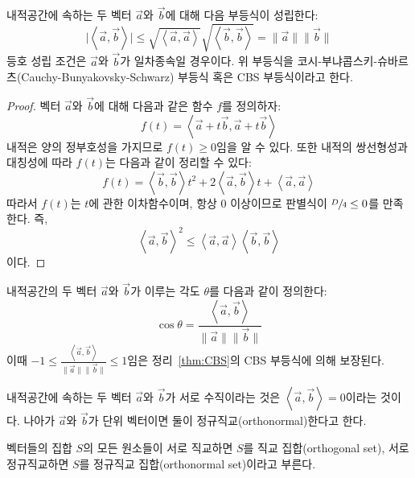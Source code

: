 \documentclass[sections/engineering_mathematics_lecture_note.tex]{subfiles}
\begin{document}
\begin{theorem}  \label{thm:CBS}
    내적공간에 속하는 두 벡터 $\vec a$와 $\vec b$에 대해 다음 부등식이 성립한다:
    \begin{equation*}
        \bigl|\left<\vec a, \vec b\right>\bigr| \leq \sqrt{\left<\vec a, \vec a\right>} \sqrt{\left<\vec b, \vec b\right>} = \lVert \vec a \rVert \lVert \vec b \rVert
    \end{equation*}
    등호 성립 조건은 $\vec a$와 $\vec b$가 일차종속일 경우이다.
    위 부등식을 코시-부냐콥스키-슈바르츠(Cauchy-Bunyakovsky-Schwarz) 부등식 혹은 CBS 부등식이라고 한다.
\end{theorem}

\begin{proof}
    벡터 $\vec a$와 $\vec b$에 대해 다음과 같은 함수 $f$를 정의하자:
    \begin{equation*}
        f(t) = \left<\vec a + t \vec b, \vec a + t \vec b\right>
    \end{equation*}
    내적은 양의 정부호성을 가지므로 $f(t) \geq 0$임을 알 수 있다.
    또한 내적의 쌍선형성과 대칭성에 따라 $f(t)$는 다음과 같이 정리할 수 있다:
    \begin{equation*}
        f(t) = \left<\vec b, \vec b\right> t^2 + 2 \left<\vec a, \vec b\right> t + \left<\vec a, \vec a\right>
    \end{equation*}
    따라서 $f(t)$는 $t$에 관한 이차함수이며, 항상 0 이상이므로 판별식이 $\sfrac D4 \leq 0$를 만족한다.
    즉,
    \begin{equation*}
       \left<\vec a, \vec b\right>^2 \leq \left<\vec a, \vec a\right> \left<\vec b, \vec b\right>
    \end{equation*}
    이다.
\end{proof}

\begin{definition}
    내적공간의 두 벡터 $\vec a$와 $\vec b$가 이루는 각도 $\theta$를 다음과 같이 정의한다:
    \begin{equation*}
        \cos \theta = \frac{\left<\vec a, \vec b\right>}{\lVert \vec a\rVert \lVert \vec b \rVert}
    \end{equation*}
    이때 $-1 \leq \frac{\left<\vec a, \vec b\right>}{\lVert \vec a\rVert \lVert \vec b \rVert} \leq 1$임은 정리~\ref{thm:CBS}의 CBS 부등식에 의해 보장된다.
\end{definition}

\begin{definition}
    내적공간에 속하는 두 벡터 $\vec a$와 $\vec b$가 서로 수직이라는 것은 $\left<\vec a, \vec b\right> = 0$이라는 것이다.
    나아가 $\vec a$와 $\vec b$가 단위 벡터이면 둘이 정규직교(orthonormal)한다고 한다.

    벡터들의 집합 $S$의 모든 원소들이 서로 직교하면 $S$를 직교 집합(orthogonal set), 서로 정규직교하면 $S$를 정규직교 집합(orthonormal set)이라고 부른다.
\end{definition}
\end{document}
